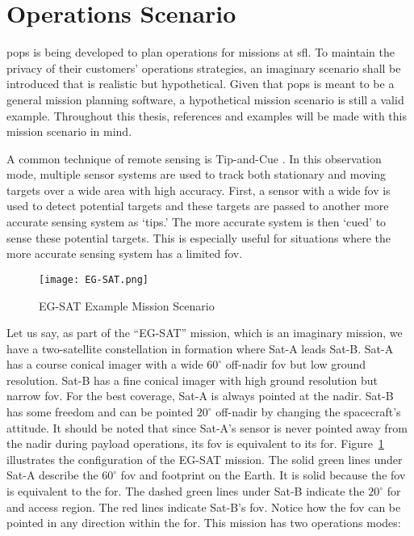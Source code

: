 \section{Operations Scenario}

\gls{pops} is being developed to plan operations for missions at \gls{sfl}. To
maintain the privacy of their customers' operations strategies, an imaginary
scenario shall be introduced that is realistic but hypothetical. Given that
\gls{pops} is meant to be a general mission planning software, a hypothetical
mission scenario is still a valid example. Throughout this thesis, references
and examples will be made with this mission scenario in mind.

A common technique of remote sensing is Tip-and-Cue \cite{ali_tip_2021}.  In
this observation mode, multiple sensor systems are used to track both
stationary and moving targets over a wide area with high accuracy. First, a
sensor with a wide \gls{fov} is used to detect potential targets and these
targets are passed to another more accurate sensing system as ‘tips.’ The more
accurate system is then ‘cued’ to sense these potential targets. This is
especially useful for situations where the more accurate sensing system has a
limited \gls{fov}.

\begin{figure}[h]
    \centering
    \texttt{[image: EG-SAT.png]} 
    \caption{EG-SAT Example Mission Scenario}
    \label{fig:eg-sat-1} 
\end{figure}

Let us say, as part of the “EG-SAT” mission, which is an imaginary mission, we
have a two-satellite constellation in formation where Sat-A leads Sat-B. Sat-A
has a course conical imager with a wide $60^\circ$ off-nadir \gls{fov} but low
ground resolution.  Sat-B has a fine conical imager with high ground resolution
but narrow \gls{fov}.  For the best coverage, Sat-A is always pointed at the
nadir.  Sat-B has some freedom and can be pointed $20^\circ$ off-nadir by
changing the spacecraft’s attitude.  It should be noted that since Sat-A’s
sensor is never pointed away from the nadir during payload operations, its
\gls{fov} is equivalent to its \gls{for}. Figure~\ref{fig:eg-sat-1} illustrates
the configuration of the EG-SAT mission.  The solid green lines under Sat-A
describe the $60^\circ$ \gls{fov} and footprint on the Earth. It is solid
because the \gls{fov} is equivalent to the \gls{for}. The dashed green lines
under Sat-B indicate the $20^\circ$ \gls{for} and access region. The red lines
indicate Sat-B's \gls{fov}. Notice how the \gls{fov} can be pointed in any
direction within the \gls{for}. This mission has two operations modes: 

